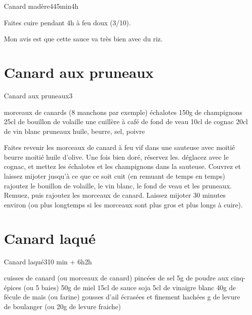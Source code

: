{\begin{recette}{Canard madère}{4}{45min}{4h}
\begin{cuisson}
Faites cuire pendant 4h à feu doux (3/10).
\end{cuisson}


\begin{remarque}
Mon avis est que cette sauce va très bien avec du riz.
\end{remarque}

\end{recette}

\section{Canard aux pruneaux}
\begin{recette}{Canard aux pruneaux}{3}{}{}
\begin{ingredients}
\ingredient morceaux de canards (8 manchons par exemple)
 échalotes
\ingredient 150g de champignons
\ingredient 25cl de bouillon de volaille
\ingredient une cuillère à café de fond de veau
\ingredient 10cl de cognac
\ingredient 20cl de vin blanc
\ingredient pruneaux
\ingredient huile, beurre, sel, poivre
\end{ingredients}

\begin{preparation}
\etape Faites revenir les morceaux de canard à feu vif dans une sauteuse avec moitié beurre moitié huile d'olive. Une fois bien 
doré, réservez les.
\etape déglacez avec le cognac, et mettez les échalotes et les champignons dans la sauteuse. Couvrez et laissez mijoter jusqu'à 
ce que ce soit cuit (en remuant de temps en temps)
\etape rajoutez le bouillon de volaille, le vin blanc, le fond de veau et les pruneaux. Remuez, puis rajoutez les morceaux de 
canard.
\etape Laissez mijoter 30 minutes environ (ou plus longtemps si les morceaux sont plus gros et plus longs à cuire).
\end{preparation}

\end{recette}

\section{Canard laqué}
\begin{recette}{Canard laqué}{3}{10 min + 6h}{2h}

\begin{ingredients}
 cuisses de canard (ou morceaux de canard)
 pincées de sel
\ingredient 5g de poudre aux cinq-épices (ou 5 baies)
\ingredient 50g de miel
\ingredient 15cl de sauce soja
\ingredient 5cl de vinaigre blanc
\ingredient 40g de fécule de maïs (ou farine)
 gousses d'ail écrasées et finement hachées
 g de levure de boulanger (ou 20g de levure fraiche)
\end{ingredients}


\end{recette}}
